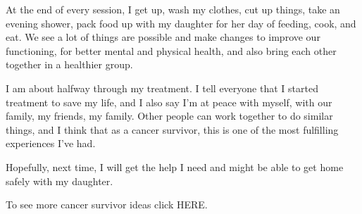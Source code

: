 \documentclass{article}
\begin{document}
At the end of every session, I get up, wash my clothes, cut up things, take an evening shower, pack food up with my daughter for her day of feeding, cook, and eat. We see a lot of things are possible and make changes to improve our functioning, for better mental and physical health, and also bring each other together in a healthier group.

I am about halfway through my treatment. I tell everyone that I started treatment to save my life, and I also say I’m at peace with myself, with our family, my friends, my family. Other people can work together to do similar things, and I think that as a cancer survivor, this is one of the most fulfilling experiences I’ve had.

Hopefully, next time, I will get the help I need and might be able to get home safely with my daughter.

To see more cancer survivor ideas click HERE.
\end{document}
